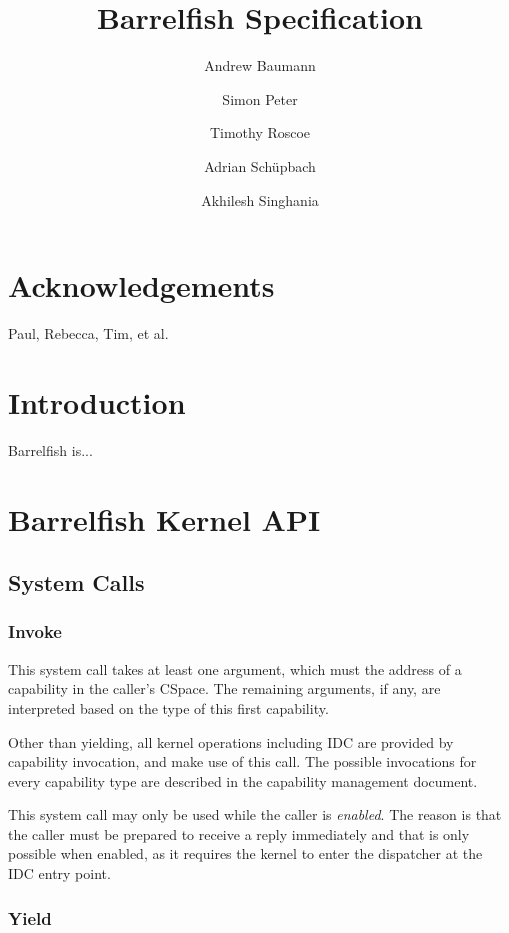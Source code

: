 \documentclass{scrreprt}
\title{Barrelfish Specification}
\author{Andrew Baumann \and Simon Peter \and Timothy Roscoe \and
  Adrian Sch\"upbach \and Akhilesh Singhania}
\begin{document}
  \maketitle

  \chapter*{Acknowledgements}

  Paul, Rebecca, Tim, et al.

  \cleardoublepage
  \tableofcontents
  \listoftables
  \listoffigures

  \chapter{Introduction}

  Barrelfish is...

  \chapter{Barrelfish Kernel API}

  \section{System Calls}\label{sec:syscalls}

  \subsection{Invoke}\label{sec:sys_invoke}
  
  This system call takes at least one argument, which must the address of a
  capability in the caller's CSpace. The remaining arguments, if any, are
  interpreted based on the type of this first capability.
    
    Other than yielding, all kernel operations including IDC are
    provided by capability invocation, and make use of this call. The
    possible invocations for every capability type are described in
    the capability management document.
    
    This system call may only be used while the caller is
    \emph{enabled}. The reason is that the caller must be prepared to
    receive a reply immediately and that is only possible when
    enabled, as it requires the kernel to enter the dispatcher at the
    IDC entry point.
    
    \subsection{Yield}\label{sec:sys_yield}
    
\end{document}
